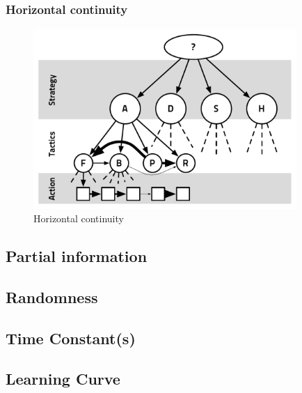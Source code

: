 \subsubsection{Horizontal continuity}
\begin{figure}
\begin{center}
\includegraphics[width=10cm]{images/horizontal_cont_abstract_decision_hierarchy.pdf}
\end{center}
\caption{Horizontal continuity}
\label{fig:horizontalcont}
\end{figure}

\subsection{Partial information}

\subsection{Randomness}

\subsection{Time Constant(s)}

\subsection{Learning Curve}

